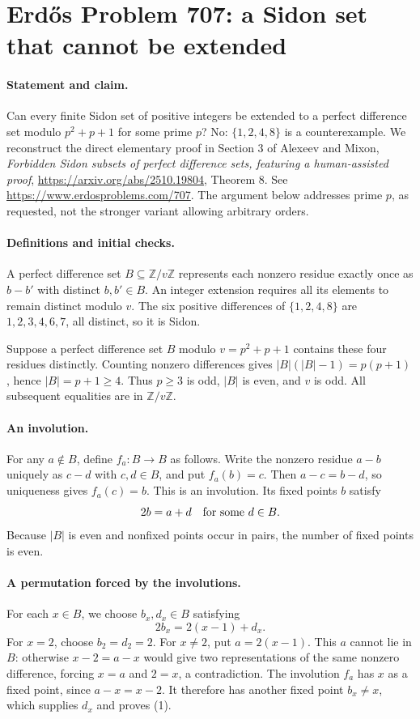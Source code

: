 \section*{Erd\H{o}s Problem 707: a Sidon set that cannot be extended}

\paragraph{Statement and claim.}
Can every finite Sidon set of positive integers be extended to a
perfect difference set modulo \(p^2+p+1\) for some prime \(p\)?
No: \(\{1,2,4,8\}\) is a counterexample.
We reconstruct the direct elementary proof in Section 3 of
Alexeev and Mixon, \emph{Forbidden Sidon subsets of perfect
difference sets, featuring a human-assisted proof},
\url{https://arxiv.org/abs/2510.19804}, Theorem 8.
See \url{https://www.erdosproblems.com/707}.
The argument below addresses prime \(p\), as requested, not the
stronger variant allowing arbitrary orders.

\paragraph{Definitions and initial checks.}
A perfect difference set \(B\subseteq\mathbb Z/v\mathbb Z\)
represents each nonzero residue exactly once as \(b-b'\) with
distinct \(b,b'\in B\).
An integer extension requires all its elements to remain distinct
modulo \(v\).
The six positive differences of \(\{1,2,4,8\}\) are
\(1,2,3,4,6,7\), all distinct, so it is Sidon.

Suppose a perfect difference set \(B\) modulo \(v=p^2+p+1\)
contains these four residues distinctly.
Counting nonzero differences gives \(|B|(|B|-1)=p(p+1)\), hence
\(|B|=p+1\geq4\).
Thus \(p\geq3\) is odd, \(|B|\) is even, and \(v\) is odd.
All subsequent equalities are in \(\mathbb Z/v\mathbb Z\).

\paragraph{An involution.}
For any \(a\notin B\), define \(f_a:B\to B\) as follows.
Write the nonzero residue \(a-b\) uniquely as \(c-d\) with
\(c,d\in B\), and put \(f_a(b)=c\).
Then \(a-c=b-d\), so uniqueness gives \(f_a(c)=b\).
This is an involution. Its fixed points \(b\) satisfy
\[
 2b=a+d\quad\hbox{for some }d\in B.
\]
Because \(|B|\) is even and nonfixed points occur in pairs,
the number of fixed points is even.

\paragraph{A permutation forced by the involutions.}
For each \(x\in B\), we choose \(b_x,d_x\in B\) satisfying
\[
 2b_x=2(x-1)+d_x.                                               \tag{1}
\]
For \(x=2\), choose \(b_2=d_2=2\).
For \(x\ne2\), put \(a=2(x-1)\). This \(a\) cannot lie in \(B\):
otherwise \(x-2=a-x\) would give two representations of the
same nonzero difference, forcing \(x=a\) and \(2=x\), a
contradiction. The involution \(f_a\) has \(x\) as a fixed point,
since \(a-x=x-2\).
It therefore has another fixed point \(b_x\ne x\), which supplies
\(d_x\) and proves (1).

